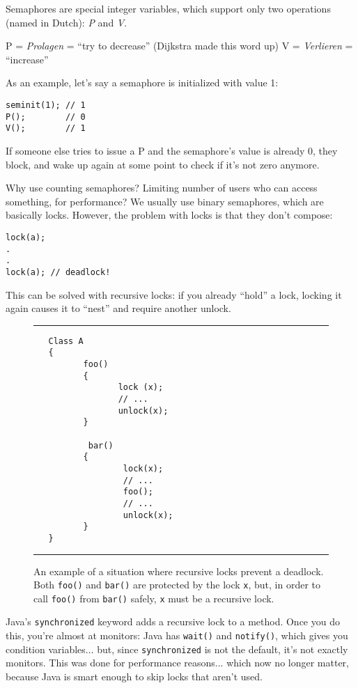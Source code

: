 \documentclass[twoside]{article}
\begin{document}
Semaphores are special integer variables, which support only two operations (named in Dutch): \textit{P} and \textit{V}.

P = \textit{Prolagen} = ``try to decrease'' (Dijkstra made this word up)\newline
V = \textit{Verlieren} = ``increase''

As an example, let's say a semaphore is initialized with value 1:

\begin{verbatim}
seminit(1); // 1
P();        // 0
V();        // 1
\end{verbatim}

If someone else tries to issue a P and the semaphore's value is already 0, they block, and wake up again at some point to check if it's not zero anymore.

Why use counting semaphores? Limiting number of users who can access something, for performance? We usually use binary semaphores, which are basically locks. However, the problem with locks is that they don't compose:

\begin{verbatim}
lock(a);
.
.
lock(a); // deadlock!
\end{verbatim}

This can be solved with recursive locks: if you already ``hold'' a lock, locking it again causes it to ``nest'' and require another unlock.

\begin{figure}[h]
\rule{\textwidth}{1pt}
\begin{verbatim}
   Class A
   {
          foo()
          {
                 lock (x);
                 // ...
                 unlock(x);
          }

           bar()
          {
                  lock(x);
                  // ...
                  foo();
                  // ...
                  unlock(x);
          }
   }
\end{verbatim}
\rule{\textwidth}{1pt}
\caption{An example of a situation where recursive locks prevent a deadlock. Both \texttt{foo()} and \texttt{bar()} are protected by the lock \texttt{x}, but, in order to call \texttt{foo()} from \texttt{bar()} safely, \texttt{x} must be a recursive lock.}
\end{figure}

Java's \texttt{synchronized} keyword adds a recursive lock to a method. Once you do this, you're almost at monitors: Java has \texttt{wait()} and \texttt{notify()}, which gives you condition variables... but, since \texttt{synchronized} is not the default, it's not exactly monitors. This was done for performance reasons... which now no longer matter, because Java is smart enough to skip locks that aren't used.
\end{document}
